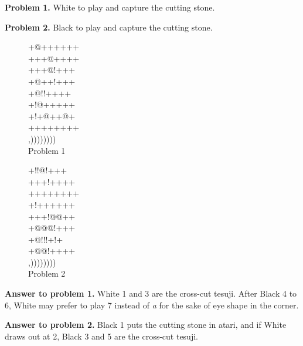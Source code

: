 \documentclass[mcrownvopaper,10pt,twopage,onecolumn,final]{memoir}
\begin{document}
\noindent
\textbf{Problem 1.} White to play and capture the cutting stone.

\noindent
\textbf{Problem 2.} Black to play and capture the cutting stone.

\begin{figure}[ht]
    \begin{minipage}[c]{0.5\linewidth}
        \centering    
        {\gnos%
        +@++++++\\
        +++@++++\\
        +++@!+++\\
        +@++!+++\\
        +@!!++++\\
        +!@+++++\\
        +!+@++@+\\
        ++++++++\\
        ,))))))))\\
        }
        Problem 1
    \end{minipage}%
    \begin{minipage}[c]{0.5\linewidth}
        \centering    
        {\gnos%
        +!!@!+++\\
        +++!++++\\
        ++++++++\\
        +!++++++\\
        +++!@@++\\
        +@@@!+++\\
        +@!!!+!+\\
        +@@!++++\\
        ,))))))))\\
        }
        Problem 2
    \end{minipage}
\end{figure}

\noindent
\textbf{Answer to problem 1.} White 1 and 3 are the cross-cut tesuji. After Black
4 to 6, White may prefer to play 7 instead of \textit{a} for the sake of eye shape
in the corner.

\noindent
\textbf{Answer to problem 2.} Black 1 puts the cutting stone in atari, and if
White draws out at 2, Black 3 and 5 are the cross-cut tesuji.
\end{document}
